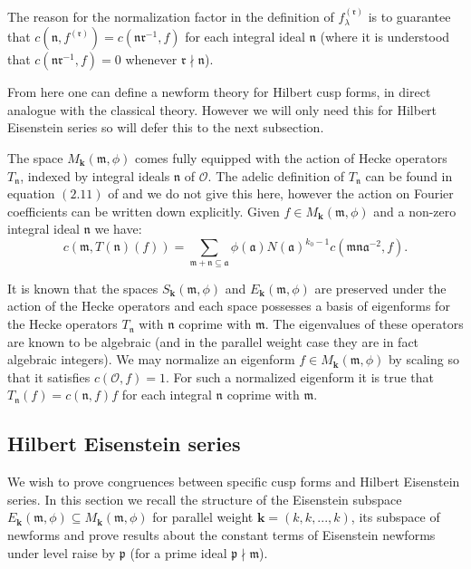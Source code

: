 \documentclass[a4paper,oneside]{amsart}
\theoremstyle{plain}
\theoremstyle{definition}
\begin{document}
The reason for the normalization factor in the definition of $f^{(\mathfrak{r})}_{\lambda}$ is to guarantee that $c(\mathfrak{n},f^{(\mathfrak{r})}) = c(\mathfrak{nr}^{-1},f)$ for each integral ideal $\mathfrak{n}$ (where it is understood that $c(\mathfrak{nr}^{-1},f) = 0$ whenever $\mathfrak{r}\nmid\mathfrak{n}$).

From here one can define a newform theory for Hilbert cusp forms, in direct analogue with the classical theory. However we will only need this for Hilbert Eisenstein series so will defer this to the next subsection.

The space $M_{\textbf{k}}(\mathfrak{m},\phi)$ comes fully equipped with the action of Hecke operators $T_{\mathfrak{n}}$, indexed by integral ideals $\mathfrak{n}$ of $\mathcal{O}$. The adelic definition of $T_{\mathfrak{n}}$ can be found in equation $(2.11)$ of \cite{shimura} and we do not give this here, however the action on Fourier coefficients can be written down explicitly. Given $f\in M_{\textbf{k}}(\mathfrak{m},\phi)$ and a non-zero integral ideal $\mathfrak{n}$ we have: \[c(\mathfrak{m},T(\mathfrak{n})(f)) = \sum_{\mathfrak{m}+\mathfrak{n} \subseteq \mathfrak{a}} \phi(\mathfrak{a})N(\mathfrak{a})^{k_0-1}c(\mathfrak{mna}^{-2},f).\]

It is known that the spaces $S_{\textbf{k}}(\mathfrak{m},\phi)$ and $E_{\textbf{k}}(\mathfrak{m},\phi)$ are preserved under the action of the Hecke operators and each space possesses a basis of eigenforms for the Hecke operators $T_{\mathfrak{n}}$ with $\mathfrak{n}$ coprime with $\mathfrak{m}$. The eigenvalues of these operators are known to be algebraic (and in the parallel weight case they are in fact algebraic integers). We may normalize an eigenform $f\in M_{\textbf{k}}(\mathfrak{m},\phi)$ by scaling so that it satisfies $c(\mathcal{O},f) = 1$. For such a normalized eigenform it is true that $T_{\mathfrak{n}}(f) = c(\mathfrak{n},f)f$ for each integral $\mathfrak{n}$ coprime with $\mathfrak{m}$.



\subsection{Hilbert Eisenstein series}

We wish to prove congruences between specific cusp forms and Hilbert Eisenstein series. In this section we recall the structure of the Eisenstein subspace $E_{\textbf{k}}(\mathfrak{m},\phi)\subseteq M_{\textbf{k}}(\mathfrak{m},\phi)$ for parallel weight $\textbf{k} = (k,k,...,k)$, its subspace of newforms and prove results about the constant terms of Eisenstein newforms under level raise by $\mathfrak{p}$ (for a prime ideal $\mathfrak{p}\nmid\mathfrak{m}$).
\end{document}
